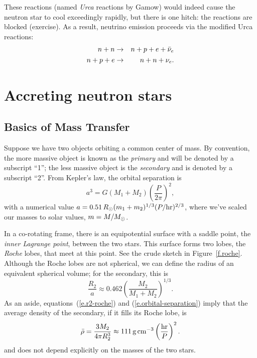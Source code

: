 These reactions (named \emph{Urca} reactions by Gamow) would indeed cause the neutron star to cool exceedingly rapidly, but there is one hitch: the reactions are blocked (exercise).  As a result, neutrino emission proceeds via the modified Urca reactions:
\begin{eqnarray}
n+n &\to& n + p + e + \bar{\nu}_{e}\\
n + p + e &\to& n + n + \nu_{e}.
\end{eqnarray}

\section{Accreting neutron stars}

\subsection{Basics of Mass Transfer}\label{s.mass-transfer}

Suppose we have two objects orbiting a common center of mass.  By convention, the more massive object is known as the \emph{primary} and will be denoted by a subscript ``1''; the less massive object is the \emph{secondary} and is denoted by a subscript ``2''.  From Kepler's law, the orbital separation is
\begin{equation}\label{e.orbital-separation}
	a^{3} = G(M_{1}+M_{2}) \left(\frac{P}{2\pi}\right)^{2}, 
\end{equation}
with a numerical value $a = 0.51\, R_{\odot} (m_{1}+m_{2})^{1/3} (P/\mathrm{hr})^{2/3}$, where we've scaled our masses to solar values, $m = M/M_\odot$.

In a co-rotating frame, there is an equipotential surface with a saddle point, the \emph{inner Lagrange point}, between the two stars.  This surface forms two lobes, the \emph{Roche} lobes, that meet at this point. See the crude sketch in Figure~\ref{f.roche}.
Although the Roche lobes are not spherical, we can define the radius of an equivalent spherical volume; for the secondary, this is
\begin{equation}\label{e.r2-roche}
\frac{R_{2}}{a} \approx 0.462 \left(\frac{M_{2}}{M_{1} + M_{2}}\right)^{1/3}.
\end{equation}
As an aside, equations~(\ref{e.r2-roche}) and (\ref{e.orbital-separation}) imply that the average density of the secondary, if it fills its Roche lobe, is
\[
	\bar{\rho} = \frac{3M_{2}}{4\pi R_{2}^{3}} \approx 111\,\mathrm{g}\,{\mathrm{c}\mathrm{m}}^{-3}\left(\frac{\mathrm{hr}}{P}\right)^{2}.
\]
and does not depend explicitly on the masses of the two stars.

